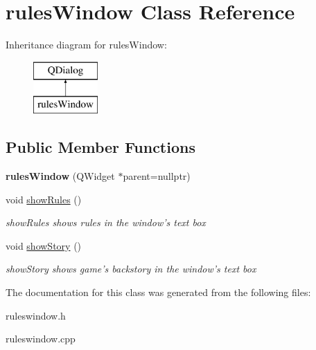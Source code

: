 \hypertarget{classrules_window}{\section{rules\-Window Class Reference}
\label{classrules_window}
}
Inheritance diagram for rules\-Window\-:\begin{figure}[H]
\begin{center}
\leavevmode
\includegraphics[height=2.000000cm]{classrules_window}
\end{center}
\end{figure}
\subsection*{Public Member Functions}
\begin{DoxyCompactItemize}
\item 
\hypertarget{classrules_window_ab68d6cd4114f873adf625c953d91480b}{{\bfseries rules\-Window} (Q\-Widget $\ast$parent=nullptr)}\label{classrules_window_ab68d6cd4114f873adf625c953d91480b}

\item 
\hypertarget{classrules_window_ab15704667d1b4e8f85f9ab30ddc649ae}{void \hyperlink{classrules_window_ab15704667d1b4e8f85f9ab30ddc649ae}{show\-Rules} ()}\label{classrules_window_ab15704667d1b4e8f85f9ab30ddc649ae}

\begin{DoxyCompactList}\small\item\em show\-Rules shows rules in the window's text box \end{DoxyCompactList}\item 
\hypertarget{classrules_window_acbe021b744465bfa0edc382f46c12cdb}{void \hyperlink{classrules_window_acbe021b744465bfa0edc382f46c12cdb}{show\-Story} ()}\label{classrules_window_acbe021b744465bfa0edc382f46c12cdb}

\begin{DoxyCompactList}\small\item\em show\-Story shows game's backstory in the window's text box \end{DoxyCompactList}\end{DoxyCompactItemize}


The documentation for this class was generated from the following files\-:\begin{DoxyCompactItemize}
\item 
ruleswindow.\-h\item 
ruleswindow.\-cpp\end{DoxyCompactItemize}
